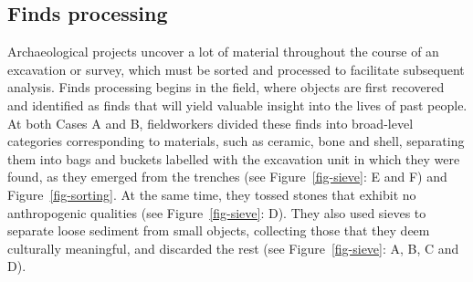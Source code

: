 \documentclass[
  canadian,
]{article}
\begin{document}
\begin{excerpt}


\caption{\label{exc-collecting-spatial-data}Communicating while
collecting spatial data.}

\end{excerpt}%

\subsection{Finds processing}\label{finds-processing}

Archaeological projects uncover a lot of material throughout the course
of an excavation or survey, which must be sorted and processed to
facilitate subsequent analysis. Finds processing begins in the field,
where objects are first recovered and identified as finds that will
yield valuable insight into the lives of past people. At both Cases A
and B, fieldworkers divided these finds into broad-level categories
corresponding to materials, such as ceramic, bone and shell, separating
them into bags and buckets labelled with the excavation unit in which
they were found, as they emerged from the trenches (see
Figure~\ref{fig-sieve}: E and F) and Figure~\ref{fig-sorting}. At the
same time, they tossed stones that exhibit no anthropogenic qualities
(see Figure~\ref{fig-sieve}: D). They also used sieves to separate loose
sediment from small objects, collecting those that they deem culturally
meaningful, and discarded the rest (see Figure~\ref{fig-sieve}: A, B, C
and D).
\end{document}
